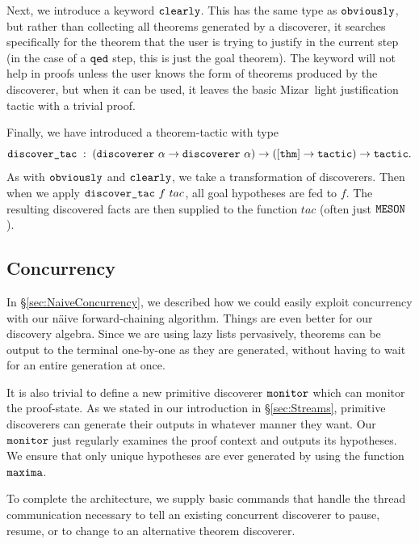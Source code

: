 Next, we introduce a keyword $\texttt{clearly}$. This has the same type as $\texttt{obviously}$, but rather than collecting all theorems generated by a discoverer, it searches specifically for the theorem that the user is trying to justify in the current step (in the case of a $\texttt{qed}$ step, this is just the goal theorem). The keyword will not help in proofs unless the user knows the form of theorems produced by the discoverer, but when it can be used, it leaves the basic Mizar~light justification tactic with a trivial proof.

\label{sec:DiscoverTac}
Finally, we have introduced a theorem-tactic  with type
\begin{displaymath}
\code{discover\_tac}\;:\;(\code{discoverer}\ \alpha\rightarrow\code{discoverer}\ \alpha) \rightarrow ([\code{thm}] \rightarrow \code{tactic}) \rightarrow \code{tactic}.
\end{displaymath}
As with $\texttt{obviously}$ and $\texttt{clearly}$, we take a transformation of discoverers. Then when we apply $\texttt{discover\_tac}\ f\ tac$,  all goal hypotheses are fed to $f$. The resulting discovered facts are then supplied to the function $tac$ (often just $\texttt{MESON}$).

\subsection{Concurrency}
In \S\ref{sec:NaiveConcurrency}, we described how we could easily exploit concurrency with our n\"{a}ive forward-chaining algorithm. Things are even better for our discovery algebra. Since we are using lazy lists pervasively, theorems can be output to the terminal one-by-one as they are generated, without having to wait for an entire generation at once.

It is also trivial to define a new primitive discoverer $\texttt{monitor}$ which can monitor the proof-state. As we stated in our introduction in \S\ref{sec:Streams}, primitive discoverers can generate their outputs in whatever manner they want. Our $\texttt{monitor}$ just regularly examines the proof context and outputs its hypotheses. We ensure that only unique hypotheses are ever generated by using the function $\texttt{maxima}$.

To complete the architecture, we supply basic commands that handle the thread communication necessary to tell an existing concurrent discoverer to pause, resume, or to change to an alternative theorem discoverer.


